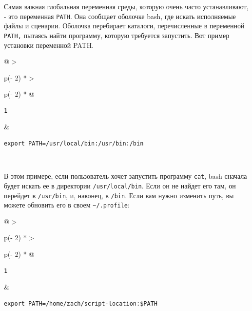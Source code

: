 \documentclass{article}
\begin{document}
Самая важная глобальная переменная среды, которую очень часто
устанавливают, - это переменная \texttt{PATH}. Она сообщает оболочке
bash, где искать исполняемые файлы и сценарии. Оболочка перебирает
каталоги, перечисленные в переменной \texttt{PATH,} пытаясь найти
программу, которую требуется запустить. Вот пример установки переменной
PATH.

\begin{longtable}[]{@{}
  >{\raggedright\arraybackslash}p{(\columnwidth - 2\tabcolsep) * }
  >{\raggedright\arraybackslash}p{(\columnwidth - 2\tabcolsep) * }@{}}
\toprule
\endhead
\begin{minipage}[t]{\linewidth}\raggedright
\begin{verbatim}
1
\end{verbatim}
\end{minipage} & \begin{minipage}[t]{\linewidth}\raggedright
\begin{verbatim}
export PATH=/usr/local/bin:/usr/bin:/bin
\end{verbatim}
\end{minipage} \\ \addlinespace
\bottomrule
\end{longtable}

В этом примере, если пользователь хочет запустить программу
\texttt{cat}, bash сначала будет искать ее в директории
\texttt{/usr/local/bin}. Если он не найдет его там, он перейдет в
\texttt{/usr/bin}, и, наконец, в \texttt{/bin}. Если вам нужно изменить
путь, вы можете обновить его в своем
\texttt{\textasciitilde{}/.profile}:

\begin{longtable}[]{@{}
  >{\raggedright\arraybackslash}p{(\columnwidth - 2\tabcolsep) * }
  >{\raggedright\arraybackslash}p{(\columnwidth - 2\tabcolsep) * }@{}}
\toprule
\endhead
\begin{minipage}[t]{\linewidth}\raggedright
\begin{verbatim}
1
\end{verbatim}
\end{minipage} & \begin{minipage}[t]{\linewidth}\raggedright
\begin{verbatim}
export PATH=/home/zach/script-location:$PATH
\end{verbatim}
\end{minipage} \\ \addlinespace
\bottomrule
\end{longtable}
\end{document}
